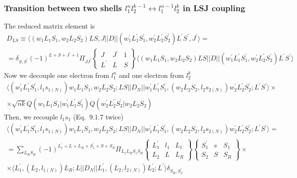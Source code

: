 \documentclass[a4paper,oneside,12pt]{extarticle}
\begin{document}
\subsubsection {Transition between two shells $l_1^n l_2^{k-1} \leftrightarrow l_1^{n-1} l_2^k$ in LSJ coupling}
%
The reduced matrix element is
%
\begin{multline}
D_{LS} \equiv \langle (w_1 L_1 S_1, w_2 L_2 S_2)LS, J || D || (w_1^{\prime} L_1^{\prime} S_1^{\prime}, w_2^{\prime} L_2^{\prime} S_2^{\prime})L^{\prime}S^{\prime}, J^{\prime} \rangle = \\ =
\delta_{S,S^{\prime}} (-1)^{L+S+J^{\prime}+1} \Pi_{JJ^{\prime}} 
\left \{
\begin{array}{ccc}
J & J^{\prime} & 1 \\
L^{\prime} & L & S
\end{array}
\right \}
\langle (w_1 L_1 S_1, w_2 L_2 S_2)LS || D || (w_1^{\prime} L_1^{\prime} S_1^{\prime}, w_2^{\prime} L_2^{\prime} S_2^{\prime})L^{\prime}S^{\prime} \rangle
\end{multline}
%
Now we decouple one electron from $l_1^n$ and one electron from $l_2^k$ 
%
\begin{multline}
\langle (w_1^{\prime} L_1^{\prime} S_1^{\prime}, l_1 s_{1(N)}) w_1 L_1 S_1, w_2 L_2 S_2 ; LS || D_N || w_1^{\prime} L_1^{\prime} S_1^{\prime}, (w_2 L_2 S_2, l_2 s_{2(N)}) w_2^{\prime} L_2^{\prime} S_2^{\prime} ; L^{\prime}S^{\prime} \rangle \times \\ \times
\sqrt{nk} Q(w_1 L_1 S_1 | w_1^{\prime} L_1^{\prime} S_1^{\prime})
Q(w_2^{\prime} L_2^{\prime} S_2^{\prime} | w_2 L_2 S_2)
\end{multline}
%
Then, we recouple $l_1s_1$ (Eq.~9.1.7 twice)
%
\begin{multline}
\langle (w_1^{\prime} L_1^{\prime} S_1^{\prime}, l_1 s_{1(N)}) w_1 L_1 S_1, w_2 L_2 S_2 ; LS || D_N || w_1^{\prime} L_1^{\prime} S_1^{\prime}, (w_2 L_2 S_2, l_2 s_{2(N)}) w_2^{\prime} L_2^{\prime} S_2^{\prime} ; L^{\prime}S^{\prime} \rangle = \\ =
\sum_{L_R S_R} (-1)^{L_1^{\prime}+L+L_R+S_1^{\prime}+S+S_R} \Pi_{L_1 L_R S_1 S_R}
\left \{
\begin{array}{ccc}
L_1^{\prime} & l_1 & L_1 \\
L_2 & L & L_R
\end{array}
\right \}
\left \{
\begin{array}{ccc}
S_1^{\prime} & s & S_1 \\
S_2 & S & S_R
\end{array}
\right \} \times \\ \times
\langle L_1^{\prime}, (L_2, l_{1(N)}) L_R ; L || D_N || L_1^{\prime}, (L_2, l_{2(N)}) L_2^{\prime} ; L^{\prime} \rangle \delta_{S_R, S_2^{\prime}}
\end{multline}
\end{document}
